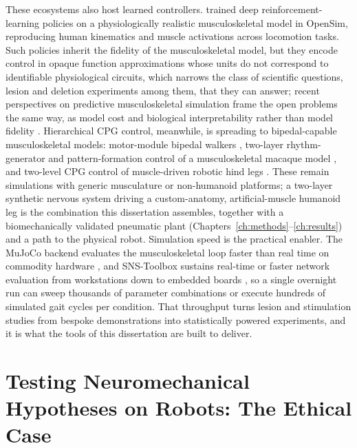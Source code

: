 These ecosystems also host learned controllers. \citet{song_deep_2021} trained deep reinforcement-learning policies on a physiologically realistic musculoskeletal model in OpenSim, reproducing human kinematics and muscle activations across locomotion tasks. Such policies inherit the fidelity of the musculoskeletal model, but they encode control in opaque function approximations whose units do not correspond to identifiable physiological circuits, which narrows the class of scientific questions, lesion and deletion experiments among them, that they can answer; recent perspectives on predictive musculoskeletal simulation frame the open problems the same way, as model cost and biological interpretability rather than model fidelity \citep{degroote_perspective_2021}. Hierarchical CPG control, meanwhile, is spreading to bipedal-capable musculoskeletal models: motor-module bipedal walkers \citep{ichimura_pathological_2019}, two-layer rhythm-generator and pattern-formation control of a musculoskeletal macaque model \citep{nishizaki_gait_2026}, and two-level CPG control of muscle-driven robotic hind legs \citep{fukuoka_autonomous_2021}. These remain simulations with generic musculature or non-humanoid platforms; a two-layer synthetic nervous system driving a custom-anatomy, artificial-muscle humanoid leg is the combination this dissertation assembles, together with a biomechanically validated pneumatic plant (Chapters~\ref{ch:methods}--\ref{ch:results}) and a path to the physical robot. Simulation speed is the practical enabler. The MuJoCo backend evaluates the musculoskeletal loop faster than real time on commodity hardware \citep{todorov_mujoco_2012, caggiano_myosuite_2022}, and SNS-Toolbox sustains real-time or faster network evaluation from workstations down to embedded boards \citep{nourse_sns_2023}, so a single overnight run can sweep thousands of parameter combinations or execute hundreds of simulated gait cycles per condition. That throughput turns lesion and stimulation studies from bespoke demonstrations into statistically powered experiments, and it is what the tools of this dissertation are built to deliver.

\section{Testing Neuromechanical Hypotheses on Robots: The Ethical Case}\label{sec:bg_ethics}


